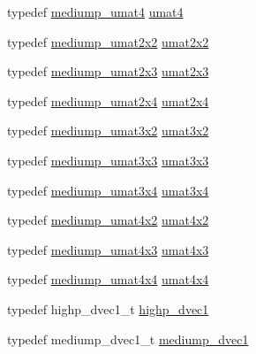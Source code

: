 \begin{DoxyCompactItemize}
typedef \hyperlink{group__gtc__matrix__integer_ga3eb3a5d85ec876ba65fad5525a5dda56}{mediump\+\_\+umat4} \hyperlink{group__gtc__matrix__integer_ga7ae562000d8a8d193e9f93cf51e2e113}{umat4}
\item 
typedef \hyperlink{group__gtc__matrix__integer_gafce8777b8b0d9d7f810853b22de3be1b}{mediump\+\_\+umat2x2} \hyperlink{group__gtc__matrix__integer_gad3c997b31dd69bdb4787867e758ed48d}{umat2x2}
\item 
typedef \hyperlink{group__gtc__matrix__integer_ga23dfc19249ad27dc4b02615f1d045ba1}{mediump\+\_\+umat2x3} \hyperlink{group__gtc__matrix__integer_ga890ae28f9230794138b2c89f44ce3376}{umat2x3}
\item 
typedef \hyperlink{group__gtc__matrix__integer_ga972445669c6e6652716f3f0b664b94cd}{mediump\+\_\+umat2x4} \hyperlink{group__gtc__matrix__integer_ga3b23b164240cf4dfb429776da7be9d88}{umat2x4}
\item 
typedef \hyperlink{group__gtc__matrix__integer_ga62243caa5b85b1cf91021ce6ffc21183}{mediump\+\_\+umat3x2} \hyperlink{group__gtc__matrix__integer_ga257300f2710612877ef45438a366e308}{umat3x2}
\item 
typedef \hyperlink{group__gtc__matrix__integer_gaa55f7815a399a780907a1dcd4caef7d9}{mediump\+\_\+umat3x3} \hyperlink{group__gtc__matrix__integer_gab80b6501ba1b2c40119a0f2d256f4c97}{umat3x3}
\item 
typedef \hyperlink{group__gtc__matrix__integer_ga21a2361cc10822ad1a2297ac286c8e26}{mediump\+\_\+umat3x4} \hyperlink{group__gtc__matrix__integer_ga5410857d098a989a30b4017100bc2ff7}{umat3x4}
\item 
typedef \hyperlink{group__gtc__matrix__integer_ga9dd5ce011ca43d90cf1b94084c7e90ac}{mediump\+\_\+umat4x2} \hyperlink{group__gtc__matrix__integer_ga13e8392218e9b6e1b7f194a21b5c88bf}{umat4x2}
\item 
typedef \hyperlink{group__gtc__matrix__integer_gac91ed5aa76fe160d5ab5d31e2b94d95b}{mediump\+\_\+umat4x3} \hyperlink{group__gtc__matrix__integer_ga08373f5588a54da1a48e5e55c7d51004}{umat4x3}
\item 
typedef \hyperlink{group__gtc__matrix__integer_ga7141a9d9f1c26521e397be34d19c1b8f}{mediump\+\_\+umat4x4} \hyperlink{group__gtc__matrix__integer_gae0931b79e808fb0983848778a60eb548}{umat4x4}
\item 
typedef highp\+\_\+dvec1\+\_\+t \hyperlink{namespaceglm_a5c7219ea9af2efb28506cabc8633a4d7}{highp\+\_\+dvec1}
\item 
typedef mediump\+\_\+dvec1\+\_\+t \hyperlink{namespaceglm_a3ccea36346bf8df6c1ebc56d43186dcd}{mediump\+\_\+dvec1}

\end{DoxyCompactItemize}
